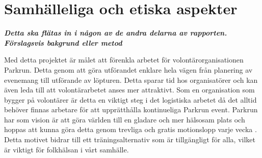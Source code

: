 \section{Samhälleliga och etiska aspekter}

\textbf{\textit{Detta ska flätas in i någon av de andra delarna av rapporten. Förslagsvis bakgrund eller metod}}

Med detta projektet är målet att förenkla arbetet för volontärorganisationen Parkrun. Detta genom att göra utförandet enklare hela vägen från planering av evenemang till utförande av löpturen. Detta sparar tid hos organisatörer och kan även leda till att volontärarbetet anses mer attraktivt. Som en organisation som bygger på volontärer är detta en viktigt steg i det logistiska arbetet då det alltid behöver finnas arbetare för att upprätthålla kontinueliga Parkrun event. Parkrun har som vision är att göra världen till en gladare och mer hälsosam plats och hoppas att kunna göra detta genom trevliga och gratis motionslopp varje vecka \cite{omOss}. Detta motivet bidrar till ett träningsalternativ som är tillgängligt för alla, vilket är viktigt för folkhälsan i vårt samhälle.